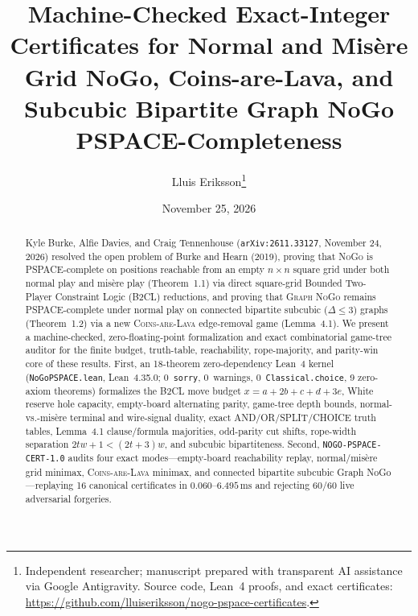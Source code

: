 \documentclass[11pt,twocolumn]{article}
\title{\textbf{Machine-Checked Exact-Integer Certificates for Normal and Mis\`ere Grid NoGo, Coins-are-Lava, and Subcubic Bipartite Graph NoGo PSPACE-Completeness}}
\author{Lluis Eriksson\thanks{Independent researcher; manuscript prepared with transparent AI assistance via Google Antigravity. Source code, Lean~4 proofs, and exact certificates: \url{https://github.com/lluiseriksson/nogo-pspace-certificates}.}}
\date{November 25, 2026}
\begin{document}
\maketitle

\begin{abstract}
Kyle Burke, Alfie Davies, and Craig Tennenhouse (\texttt{arXiv:2611.33127}, November 24, 2026) resolved the open problem of Burke and Hearn (2019), proving that \textsc{NoGo} is PSPACE-complete on positions reachable from an empty $n \times n$ square grid under both normal play and mis\`ere play (Theorem~1.1) via direct square-grid Bounded Two-Player Constraint Logic (B2CL) reductions, and proving that \textsc{Graph NoGo} remains PSPACE-complete under normal play on connected bipartite subcubic ($\Delta \le 3$) graphs (Theorem~1.2) via a new \textsc{Coins-are-Lava} edge-removal game (Lemma~4.1). We present a machine-checked, zero-floating-point formalization and exact combinatorial game-tree auditor for the finite budget, truth-table, reachability, rope-majority, and parity-win core of these results. First, an 18-theorem zero-dependency Lean~4 kernel (\texttt{NoGoPSPACE.lean}, Lean~4.35.0; 0~\texttt{sorry}, 0~warnings, 0~\texttt{Classical.choice}, 9 zero-axiom theorems) formalizes the B2CL move budget $x = a + 2b + c + d + 3e$, White reserve hole capacity, empty-board alternating parity, game-tree depth bounds, normal-vs.-mis\`ere terminal and wire-signal duality, exact AND/OR/SPLIT/CHOICE truth tables, Lemma~4.1 clause/formula majorities, odd-parity cut shifts, rope-width separation $2tw+1 < (2t+3)w$, and subcubic bipartiteness. Second, \texttt{NOGO-PSPACE-CERT-1.0} audits four exact modes—empty-board reachability replay, normal/mis\`ere grid minimax, \textsc{Coins-are-Lava} minimax, and connected bipartite subcubic Graph NoGo—replaying 16 canonical certificates in $0.060$--$6.495\,\mathrm{ms}$ and rejecting 60/60 live adversarial forgeries.
\end{abstract}
\end{document}
